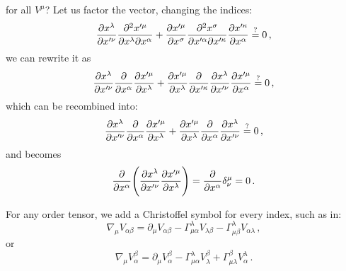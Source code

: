 \documentclass[main.tex]{subfiles}
\begin{document}
%
for all \(V^{\mu }\)? Let us factor the vector, changing the indices: 
%
\begin{equation}
    \pdv{x^{\lambda }}{x^{\prime \nu }} \pdv[2]{x^{\prime \mu }}{x^{\lambda }}{x^{\alpha }}
    + \pdv{x^{\prime \mu }}{x^{\sigma }} \pdv[2]{x^{ \sigma }}{x^{\prime \alpha }}{x^{\prime \kappa }} \pdv{x^{\prime \kappa }}{x^{ \alpha }} \overset{?}{=} 0
\,,
\end{equation}
%
we can rewrite it as 
%
\begin{equation}
    \pdv{x^{\lambda }}{x^{\prime \nu }} \pdv{}{x^{\alpha }}  \pdv{x^{\prime \mu }}{x^{\lambda }}
    + \pdv{x^{\prime \mu }}{x^{\lambda  }} 
    \pdv{}{x^{\prime \kappa }} 
    \pdv{x^{ \lambda }}{x^{\prime \nu }}
    \pdv{x^{\prime \mu }}{x^{ \alpha }} \overset{?}{=} 0
\,,
\end{equation}
%
which can be recombined into: 
%
\begin{equation}
    \pdv{x^{\lambda }}{x^{\prime \nu }} \pdv{}{x^{\alpha }}  \pdv{x^{\prime \mu }}{x^{\lambda }}
    + \pdv{x^{\prime \mu }}{x^{\lambda  }} 
    \pdv{}{x^{\alpha  }} 
    \pdv{x^{ \lambda }}{x^{\prime \nu }}
    \overset{?}{=} 0
\,,
\end{equation}
%
and becomes 
%
\begin{equation}
  \pdv{}{x^{\alpha }} \qty(\pdv{x^{\lambda }}{x^{\prime \nu }} \pdv{x^{\prime \mu }}{x^{\lambda }} ) 
  = \pdv{}{x^{\alpha }} \delta^{\mu}_{\nu }
  = 0
\,.
\end{equation}
%

For any order tensor,  we add a Christoffel symbol for every index, such as in: 
%
\begin{equation}
  \nabla_{\mu }V_{\alpha \beta }   
  = \partial_\mu V_{\alpha \beta } - \Gamma^{\lambda}_{\mu \alpha }V_{\lambda \beta }- \Gamma^{\lambda }_{\mu \beta }V_{\alpha \lambda }
\,,
\end{equation}
%
or 
%
\begin{equation}
    \nabla_{\mu }V_{\alpha}^{\beta }   
    = \partial_\mu V_{\alpha}^{\beta }
    - \Gamma^{\lambda}_{\mu \alpha }V_{\lambda}^{\beta }
    + \Gamma^{\beta }_{\mu \lambda  }V_{\alpha}^{\lambda }
\,.
\end{equation}
\end{document}
